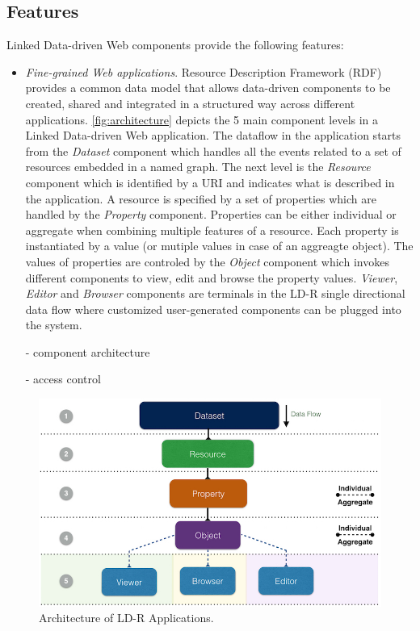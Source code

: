 \documentclass{acm_proc_article-sp}
\begin{document}
\subsection{Features}

Linked Data-driven Web components provide the following features:

\begin{itemize}

\item \emph{Fine-grained Web applications}.
Resource Description Framework (RDF) provides a common data model that allows data-driven components to be created, shared and integrated in a structured way across different applications. \autoref{fig:architecture} depicts the 5 main component levels in a Linked Data-driven Web application.
The dataflow in the application starts from the \emph{Dataset} component which handles all the events related to a set of resources embedded in a named graph.
The next level is the \emph{Resource} component which is identified by a URI and indicates what is described in the application.
A resource is specified by a set of properties which are handled by the \emph{Property} component. Properties can be either individual or aggregate when combining multiple features of a resource.
Each property is instantiated by a value (or mutiple values in case of an aggreagte object). 
The values of properties are controled by the \emph{Object} component which invokes different components to view, edit and browse the property values.
\emph{Viewer}, \emph{Editor} and \emph{Browser} components are terminals in the LD-R single directional data flow where customized user-generated components can be plugged into the system.

- component architecture

- access control

\end{itemize}


\begin{figure}[tb]
  \includegraphics[width=.9\linewidth]{images/architecture.jpg}
  \caption{Architecture of LD-R Applications.}
  \label{fig:architecture}
\end{figure}
\end{document}
